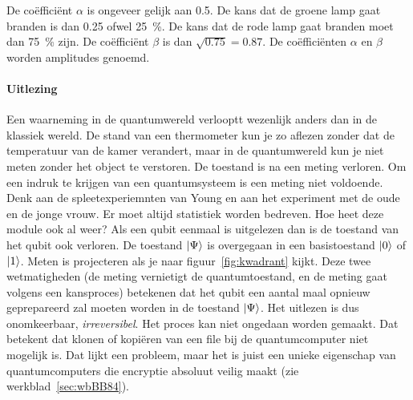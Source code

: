 \documentclass[../main.tex]{subfiles}
\begin{document}
De co\"effici\"ent $\alpha$ is ongeveer gelijk aan \num{0.5}. De kans dat de groene lamp gaat branden is dan \num{0.25} ofwel \SI{25}{\percent}. De kans dat de rode lamp gaat branden moet dan \SI{75}{\percent} zijn. De co\"effici\"ent $\beta$ is dan $\sqrt{0.75}=0.87$. De co\"effici\"enten $\alpha$ en $\beta$ worden amplitudes genoemd. 

\paragraph{Uitlezing}
Een waarneming in de quantumwereld verlooptt wezenlijk anders dan in de klassiek wereld. De stand van een thermometer kun je zo aflezen zonder dat de temperatuur van de kamer verandert, maar in de quantumwereld kun je niet meten zonder het object te verstoren. De toestand is na een meting verloren. Om een indruk te krijgen van een quantumsysteem is een meting niet voldoende. Denk aan de spleetexperiemnten van Young en aan het experiment met de oude en de jonge vrouw.
Er moet altijd statistiek worden bedreven. Hoe heet deze module ook al weer? 
Als een qubit eenmaal is uitgelezen dan is de toestand van het qubit ook verloren. De toestand $\ket{\Psi}$ is overgegaan in een basistoestand $\ket{0}$ of $\ket{1}$. Meten is projecteren als je naar figuur~\ref{fig:kwadrant} kijkt.  
Deze twee wetmatigheden (de meting vernietigt de quantumtoestand, en de meting gaat volgens een kansproces) betekenen dat het qubit een aantal maal opnieuw geprepareerd zal moeten worden in de toestand $\ket{\Psi}$.
Het uitlezen is dus onomkeerbaar, \textit{irreversibel}. Het proces kan niet ongedaan worden gemaakt. Dat betekent dat klonen of kopi\"eren van een file bij de quantumcomputer niet mogelijk is. Dat lijkt een probleem, maar het is juist  een unieke eigenschap van quantumcomputers die encryptie absoluut veilig maakt (zie werkblad~\ref{sec:wbBB84}). 
\end{document}
